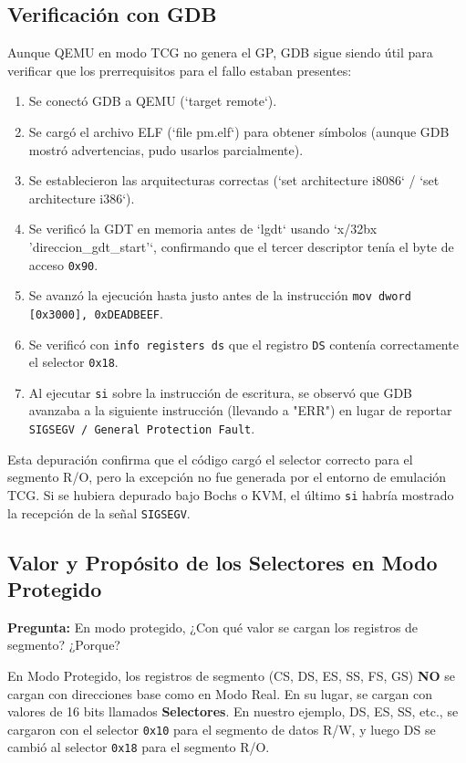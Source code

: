 \subsection{Verificación con GDB}

Aunque QEMU en modo TCG no genera el GP, GDB sigue siendo útil para verificar que los prerrequisitos para el fallo estaban presentes:
\begin{enumerate}
    \item Se conectó GDB a QEMU (`target remote`).
    \item Se cargó el archivo ELF (`file pm.elf`) para obtener símbolos (aunque GDB mostró advertencias, pudo usarlos parcialmente).
    \item Se establecieron las arquitecturas correctas (`set architecture i8086` / `set architecture i386`).
    \item Se verificó la GDT en memoria antes de `lgdt` usando `x/32bx 'direccion\_gdt\_start'`, confirmando que el tercer descriptor tenía el byte de acceso \texttt{0x90}.
    \item Se avanzó la ejecución hasta justo antes de la instrucción \texttt{mov dword [0x3000], 0xDEADBEEF}.
    \item Se verificó con \texttt{info registers ds} que el registro \texttt{DS} contenía correctamente el selector \texttt{0x18}.
    \item Al ejecutar \texttt{si} sobre la instrucción de escritura, se observó que GDB avanzaba a la siguiente instrucción (llevando a "ERR") en lugar de reportar \texttt{SIGSEGV / General Protection Fault}.
\end{enumerate}

Esta depuración confirma que el código cargó el selector correcto para el segmento R/O, pero la excepción no fue generada por el entorno de emulación TCG. Si se hubiera depurado bajo Bochs o KVM, el último \texttt{si} habría mostrado la recepción de la señal \texttt{SIGSEGV}.

\subsection{Valor y Propósito de los Selectores en Modo Protegido}

\textbf{Pregunta:} En modo protegido, ¿Con qué valor se cargan los registros de segmento? ¿Porque?

En Modo Protegido, los registros de segmento (CS, DS, ES, SS, FS, GS) \textbf{NO} se cargan con direcciones base como en Modo Real. En su lugar, se cargan con valores de 16 bits llamados \textbf{Selectores}. En nuestro ejemplo, DS, ES, SS, etc., se cargaron con el selector \texttt{0x10} para el segmento de datos R/W, y luego DS se cambió al selector \texttt{0x18} para el segmento R/O.

